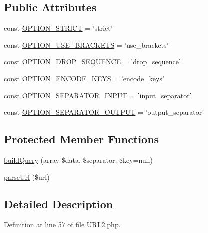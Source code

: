 \subsection*{Public Attributes}
\begin{DoxyCompactItemize}
\item 
const \hyperlink{classNet__URL2_a766955033bdccec7175d0694df62a1a9}{O\-P\-T\-I\-O\-N\-\_\-\-S\-T\-R\-I\-C\-T} = 'strict'
\item 
const \hyperlink{classNet__URL2_a864182f067e5df22055afc3a0dfe5a57}{O\-P\-T\-I\-O\-N\-\_\-\-U\-S\-E\-\_\-\-B\-R\-A\-C\-K\-E\-T\-S} = 'use\-\_\-brackets'
\item 
const \hyperlink{classNet__URL2_af415684f1d85246c1132203142b86499}{O\-P\-T\-I\-O\-N\-\_\-\-D\-R\-O\-P\-\_\-\-S\-E\-Q\-U\-E\-N\-C\-E} = 'drop\-\_\-sequence'
\item 
const \hyperlink{classNet__URL2_ae06ebc991de4ffe92644c5a8d37ad5ac}{O\-P\-T\-I\-O\-N\-\_\-\-E\-N\-C\-O\-D\-E\-\_\-\-K\-E\-Y\-S} = 'encode\-\_\-keys'
\item 
const \hyperlink{classNet__URL2_af5b6f766fae9600b3938e33c32893bce}{O\-P\-T\-I\-O\-N\-\_\-\-S\-E\-P\-A\-R\-A\-T\-O\-R\-\_\-\-I\-N\-P\-U\-T} = 'input\-\_\-separator'
\item 
const \hyperlink{classNet__URL2_a84719f522747f51638a9c8474d4abc39}{O\-P\-T\-I\-O\-N\-\_\-\-S\-E\-P\-A\-R\-A\-T\-O\-R\-\_\-\-O\-U\-T\-P\-U\-T} = 'output\-\_\-separator'
\end{DoxyCompactItemize}
\subsection*{Protected Member Functions}
\begin{DoxyCompactItemize}
\item 
\hyperlink{classNet__URL2_a44d9ffd390931b846152080feb6a1740}{build\-Query} (array \$data, \$separator, \$key=null)
\item 
\hyperlink{classNet__URL2_a498acb2786e9f3074c6d52432de4c9d4}{parse\-Url} (\$url)
\end{DoxyCompactItemize}


\subsection{Detailed Description}


Definition at line 57 of file U\-R\-L2.\-php.



